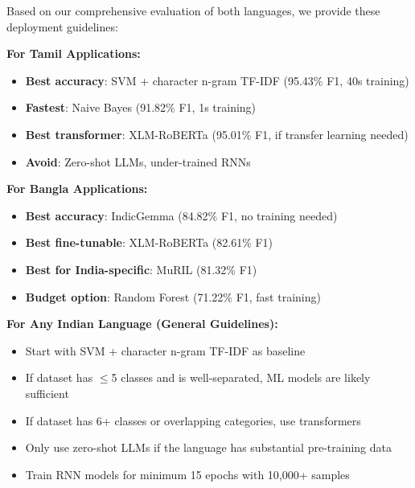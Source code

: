 \documentclass[conference]{IEEEtran}
\begin{document}
Based on our comprehensive evaluation of both languages, we provide these deployment guidelines:

\textbf{For Tamil Applications:}
\begin{itemize}
\item \textbf{Best accuracy}: SVM + character n-gram TF-IDF (95.43\% F1, 40s training)
\item \textbf{Fastest}: Naive Bayes (91.82\% F1, 1s training)
\item \textbf{Best transformer}: XLM-RoBERTa (95.01\% F1, if transfer learning needed)
\item \textbf{Avoid}: Zero-shot LLMs, under-trained RNNs
\end{itemize}

\textbf{For Bangla Applications:}
\begin{itemize}
\item \textbf{Best accuracy}: IndicGemma (84.82\% F1, no training needed)
\item \textbf{Best fine-tunable}: XLM-RoBERTa (82.61\% F1)
\item \textbf{Best for India-specific}: MuRIL (81.32\% F1)
\item \textbf{Budget option}: Random Forest (71.22\% F1, fast training)
\end{itemize}

\textbf{For Any Indian Language (General Guidelines):}
\begin{itemize}
\item Start with SVM + character n-gram TF-IDF as baseline
\item If dataset has $\leq$5 classes and is well-separated, ML models are likely sufficient
\item If dataset has 6+ classes or overlapping categories, use transformers
\item Only use zero-shot LLMs if the language has substantial pre-training data
\item Train RNN models for minimum 15 epochs with 10,000+ samples
\end{itemize}
\end{document}
